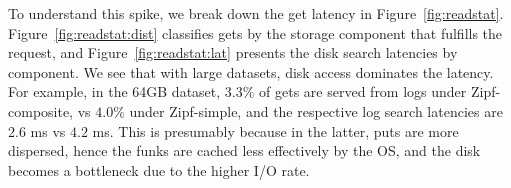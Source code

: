 To understand this spike, 
we break down the get latency in  Figure~\ref{fig:readstat}. 
Figure~\ref{fig:readstat:dist} classifies gets by the storage  component 
that fulfills the request, and Figure~\ref{fig:readstat:lat} presents the disk search latencies by component. 
We see that with large datasets, disk access dominates the latency.
For example, in the 64GB dataset, $3.3\%$ of gets are served from logs under Zipf-composite, vs $4.0\%$ under Zipf-simple,
and the respective log search latencies are $2.6$ ms vs $4.2$ ms. This is presumably because in the latter, puts are more dispersed, 
hence the funks are cached less effectively by the OS, and the disk becomes a bottleneck due to the higher I/O rate.


